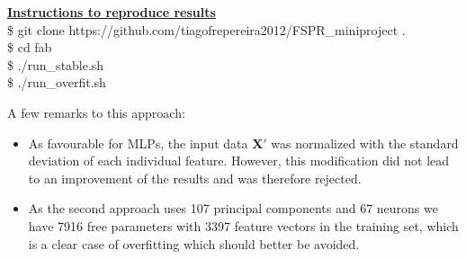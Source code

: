 \documentclass[a4paper,10pt,fleqn]{article}
\newcommand{\note}[1]{
\begin{boxitpara}{}%
\textbf{\underline{Instructions to reproduce results}} #1
\end{boxitpara}}
\begin{document}
\note{\\ 
\$ git clone https://github.com/tiagofrepereira2012/FSPR\_miniproject . \\
\$ cd fab \\
\$ ./run\_stable.sh \\
\$ ./run\_overfit.sh 
}

\vspace{1cm}
A few remarks to this approach:

\begin{itemize}
	\item As favourable for MLPs, the input data $\mathbf{X}'$ was normalized with the standard deviation of each individual feature. However, this modification did not lead to an improvement of the results and was therefore rejected.
	\item As the second approach uses 107 principal components and 67 neurons we have 7916 free parameters with 3397 feature vectors in the training set, which is a clear case of overfitting which should better be avoided.
\end{itemize}
\end{document}
